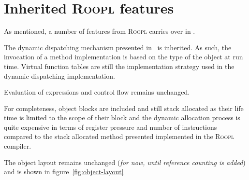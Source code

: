 \section{Inherited \textsc{Roopl} features}
As mentioned, a number of features from \textsc{Roopl} carries over in \rooplpp.

The dynamic dispatching mechanism presented in~\cite{th:roopl} is inherited. As such, the invocation of a method implementation is based on the type of the object at run time. Virtual function tables are still the implementation strategy used in the dynamic dispatching implementation.

Evaluation of expressions and control flow remains unchanged. 

For completeness, object blocks are included and still stack allocated as their life time is limited to the scope of their block and the dynamic allocation process is quite expensive in terms of register pressure and number of instructions compared to the stack allocated method presented implemented in the \textsc{Roopl} compiler.

The object layout remains unchanged (\textit{for now, until reference counting is added}) and is shown in figure~\ref{fig:object-layout}

